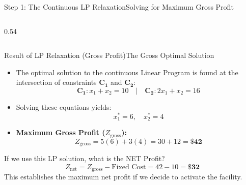 \documentclass[aspectratio=169]{beamer}
\begin{document}
\begin{frame}{Step 1: The Continuous LP Relaxation}{Solving for Maximum Gross Profit}
\begin{columns}[T]
\begin{column}{0.54\textwidth}
        \end{column}
    \end{columns}
\end{frame}

\begin{frame}{Result of LP Relaxation (Gross Profit)}{The Gross Optimal Solution}
    \begin{itemize}
        \item The optimal solution to the continuous Linear Program is found at the intersection of constraints $\mathbf{C_1}$ and $\mathbf{C_2}$:
        \[ \mathbf{C_1}: x_1 + x_2 = 10 \quad \big| \quad \mathbf{C_2}: 2x_1 + x_2 = 16 \]
        \item Solving these equations yields:
        \[ x_1^* = 6, \quad x_2^* = 4 \]
        \item \textbf{Maximum Gross Profit ($Z_{\text{gross}}$):}
        \[ Z_{\text{gross}} = 5(6) + 3(4) = 30 + 12 = \mathbf{\$42} \]
    \end{itemize}

    \begin{alertblock}{If we use this LP solution, what is the NET Profit?}
        \[ Z_{\text{net}} = Z_{\text{gross}} - \text{Fixed Cost} = 42 - 10 = \mathbf{\$32} \]
        This establishes the maximum net profit if we decide to activate the facility.
    \end{alertblock}
\end{frame}
\end{document}
